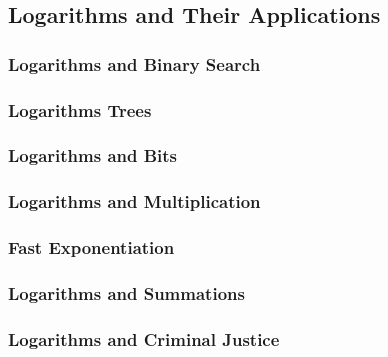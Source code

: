 \subsection{Logarithms and Their Applications}

\subsubsection{Logarithms and Binary Search}

\subsubsection{Logarithms Trees}

\subsubsection{Logarithms and Bits}

\subsubsection{Logarithms and Multiplication}

\subsubsection{Fast Exponentiation}

\subsubsection{Logarithms and Summations}

\subsubsection{Logarithms and Criminal Justice}
